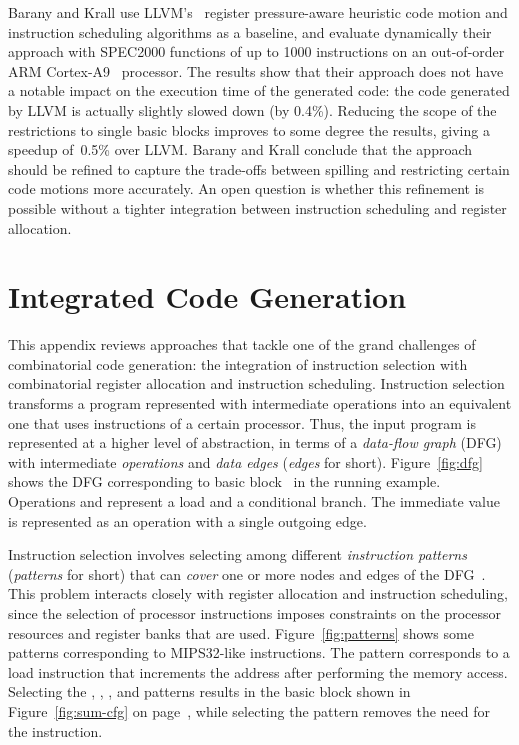 \documentclass[acmsmall,authorversion,nonacm]{acmart}
\begin{document}
Barany and Krall use LLVM's~\cite{Lattner2004} register pressure-aware
heuristic code motion and instruction scheduling algorithms as a
baseline, and evaluate dynamically their approach with SPEC2000
functions of up to 1000 instructions on an out-of-order ARM
Cortex-A9~\cite{ARM} processor.
The results show that their approach does not have a notable impact on
the execution time of the generated code: the code generated by LLVM
is actually slightly slowed down (by 0.4\%).
Reducing the scope of the restrictions to single basic blocks improves
to some degree the results, giving a speedup of~0.5\% over LLVM.
Barany and Krall conclude that the approach should be refined to
capture the trade-offs between spilling and restricting certain code
motions more accurately.
An open question is whether this refinement is possible without a
tighter integration between instruction scheduling and register
allocation.

\section{Integrated Code Generation}\label{app:full-integration}

This appendix reviews approaches that tackle one of the grand
challenges of combinatorial code generation: the integration of
instruction selection with combinatorial register allocation and
instruction scheduling.
Instruction selection transforms a program represented with
intermediate operations into an equivalent one that uses instructions
of a certain processor.
Thus, the input program is represented at a higher level of
abstraction, in terms of a \emph{data-flow graph} (DFG) with
intermediate \emph{operations} and \emph{data edges} (\emph{edges} for
short).
Figure~\ref{fig:dfg} shows the DFG corresponding to basic
block~ in the running example.
Operations  and  represent a
load and a conditional branch.
The immediate value  is represented as an operation with a single
outgoing edge.

Instruction selection involves selecting among different
\emph{instruction patterns} (\emph{patterns} for short) that can
\emph{cover} one or more nodes and edges of the
DFG~\cite{HjortBlindell2016}.
This problem interacts closely with register allocation and
instruction scheduling, since the selection of processor instructions
imposes constraints on the processor resources and register banks that
are used.
Figure~\ref{fig:patterns} shows some patterns corresponding to
MIPS32-like instructions.
The pattern  corresponds to a load instruction
that increments the address after performing the memory access.
Selecting the , ,
, and  patterns results in
the basic block  shown in Figure~\ref{fig:sum-cfg} on
page~\pageref{fig:sum-cfg}, while selecting the 
pattern removes the need for the  instruction.
\end{document}

